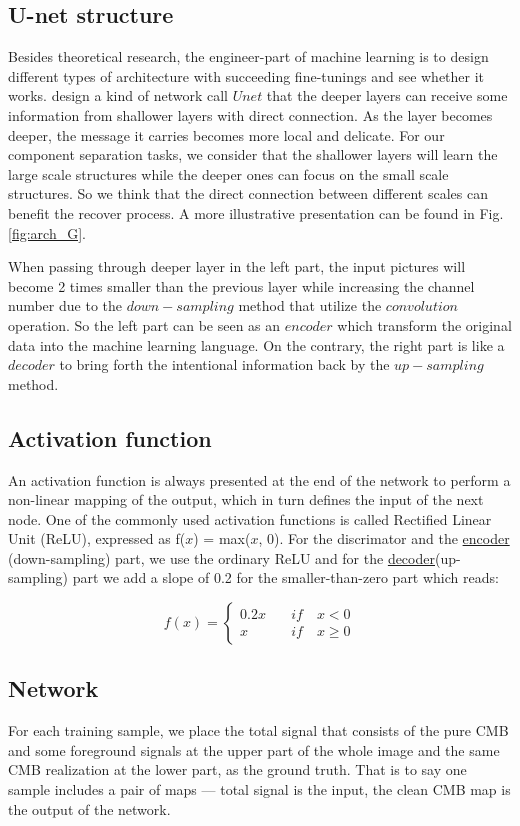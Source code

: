 \documentclass[floatfix]{emulateapj}
\begin{document}
\subsection{U-net structure}
Besides theoretical research, the engineer-part of machine learning is to design different types of architecture with succeeding fine-tunings and see whether it works. \cite{2015arXiv150504597R} design a kind of network call $Unet$ that the deeper layers can receive some information from shallower layers with direct connection. As the layer becomes deeper, the message it carries becomes more local and delicate. For our component separation tasks, we consider that the shallower layers will learn the large scale structures while the deeper ones can focus on the small scale structures.  So we think that the direct connection between different scales can benefit the recover process. A more illustrative presentation can be found in Fig. \ref{fig:arch_G}. 

When passing through deeper layer in the left part, the input pictures will become 2 times smaller than the previous layer while increasing the channel number due to the $down-sampling$ method that utilize the $convolution$ operation. So the left part can be seen as an $encoder$ which transform the original data into the machine learning language. On the contrary, the right part is like a $decoder$ to bring forth the intentional information back by the $up-sampling$ method.  


\subsection{Activation function}
An activation function is always presented at the end of the network to perform a non-linear mapping of the output, which in turn defines the input of the next node. One of the commonly used activation functions is called Rectified Linear Unit (ReLU), expressed as f($x$) = max($x$, 0). For the discrimator and the \underline{encoder} (down-sampling) part, we use the ordinary ReLU and for the \underline{decoder}(up-sampling) part we add a slope of 0.2 for the smaller-than-zero part which reads:

\begin{equation}
f(x) = 
\begin{cases}
	0.2x\quad  &if \quad x < 0 \\
	x   \quad  &if \quad x \geq 0
\end{cases}
\end{equation}
\subsection{Network}
For each training sample, we place the total signal that consists of the pure CMB and some foreground signals at the upper part of the whole image and the same CMB realization at the lower part, as the ground truth. That is to say one sample includes a pair of maps --- total signal is the input, the clean CMB map is the output of the network. 
\end{document}
